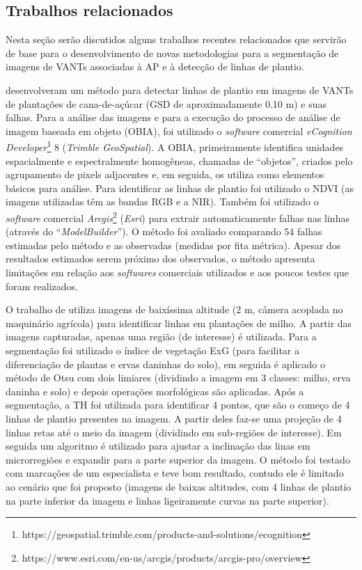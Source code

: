 \documentclass[12pt, a4paper, english, brazil]{article}
\begin{document}

\subsection{Trabalhos relacionados}

Nesta seção serão discutidos alguns trabalhos recentes relacionados que servirão de base para o desenvolvimento de novas metodologias para a segmentação de imagens de VANTs associadas à AP e à detecção de linhas de plantio.

 desenvolveram um método para detectar linhas de plantio em imagens de VANTs de plantações de cana-de-açúcar (GSD de aproximadamente 0.10 m) e suas falhas. Para a análise das imagens e para a execução do processo de análise de imagem baseada em objeto (OBIA), foi utilizado o \textit{software} comercial \textit{eCognition Developer}\footnote{https://geospatial.trimble.com/products-and-solutions/ecognition} 8 (\textit{Trimble GeoSpatial}). A OBIA, primeiramente identifica unidades espacialmente e espectralmente homogêneas, chamadas de ``objetos'', criados pelo agrupamento de pixels adjacentes e, em seguida, os utiliza como elementos básicos para análise. Para identificar as linhas de plantio foi utilizado o NDVI (as imagens utilizadas têm as bandas RGB e a NIR). Também foi utilizado o \textit{software} comercial \textit{Arcgis}\footnote{https://www.esri.com/en-us/arcgis/products/arcgis-pro/overview} (\textit{Esri}) para extrair automaticamente falhas nas linhas (através do ``\textit{ModelBuilder}''). O método foi avaliado comparando 54 falhas estimadas pelo método e as observadas (medidas por fita métrica). Apesar dos resultados estimados serem próximo dos observados, o método apresenta limitações em relação aos \textit{softwares} comerciais utilizados e aos poucos testes que foram realizados.

O trabalho de  utiliza imagens de baixíssima altitude (2 m, câmera acoplada no maquinário agrícola) para identificar linhas em plantações de milho. A partir das imagens capturadas, apenas uma região (de interesse) é utilizada. Para a segmentação foi utilizado o índice de vegetação ExG (para facilitar a diferenciação de plantas e ervas daninhas do solo), em seguida é aplicado o método de Otsu com dois limiares (dividindo a imagem em 3 classes: milho, erva daninha e solo) e depois operações morfológicas são aplicadas. Após a segmentação, a TH foi utilizada para identificar 4 pontos, que são o começo de 4 linhas de plantio presentes na imagem. A partir deles faz-se uma projeção de 4 linhas retas até o meio da imagem (dividindo em sub-regiões de interesse). Em seguida um algoritmo é utilizado para ajustar a inclinação das linas em microrregiões e expandir para a parte superior da imagem. O método foi testado com marcações de um especialista e teve bom resultado, contudo ele é limitado ao cenário que foi proposto (imagens de baixas altitudes, com 4 linhas de plantio na parte inferior da imagem e linhas ligeiramente curvas na parte superior).
\end{document}
